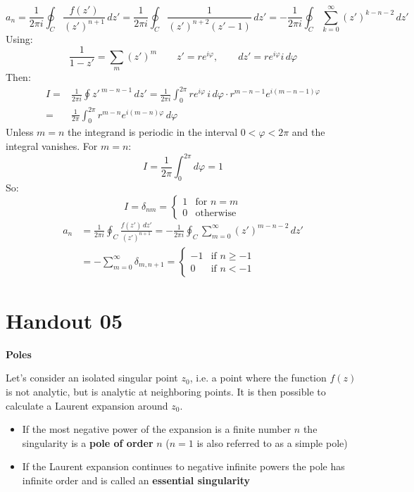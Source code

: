 \documentclass{article}
\begin{document}
\newpage
\begin{equation}
    a_n = \frac{1}{2\pi i} \oint_C \frac{f(z')}{(z')^{n+1}} \, dz'
= \frac{1}{2\pi i} \oint_C \frac{1}{(z')^{n+2}(z'-1)} \, dz'
= -\frac{1}{2\pi i} \oint_C \sum_{k=0}^{\infty} (z')^{k - n - 2} \, dz'
\end{equation}
Using:
\begin{equation}
    \frac{1}{1-z'} = \sum_m (z')^m \qquad z' = r e^{i\varphi}, \qquad dz' = r e^{i\varphi} i\, d\varphi
\end{equation}
Then:
\begin{align}
    I =& \frac{1}{2\pi i} \oint z'^{ \ m - n - 1} \, dz' = \frac{1}{2\pi i} \int_0^{2\pi} r e^{i\varphi} \, i \, d\varphi \cdot r^{m - n - 1} e^{i(m - n - 1)\varphi} \\
=& \frac{1}{2\pi} \int_0^{2\pi} r^{m - n} e^{i(m - n)\varphi} \, d\varphi
\end{align}
Unless $m=n$ the integrand is periodic in the interval $0<\varphi<2\pi$ and the integral vanishes. For $m=n$:
\begin{equation}
    I = \frac{1}{2\pi} \int_0^{2\pi} d \varphi = 1
\end{equation}
So:
\begin{equation}
    I = \delta_{nm} = 
\begin{cases}
1 & \text{for } n = m \\
0 & \text{otherwise}
\end{cases}
\end{equation}
\begin{align}
    a_n &= \frac{1}{2\pi i} \oint_C \frac{f(z')\,dz'}{(z')^{n+1}} 
= -\frac{1}{2\pi i} \oint_C \sum_{m=0}^{\infty} (z')^{m - n - 2} \, dz'\\
&= -\sum_{m=0}^{\infty} \delta_{m, n+1}
= \begin{cases}
-1 & \text{if } n \geq -1 \\
0 & \text{if } n < -1
\end{cases}
\end{align}

\section{Handout 05}

\noindent
\textbf{Poles}

\noindent
Let’s consider an isolated singular point $z_0$, i.e. a point where the function $f(z)$ is not analytic, but is analytic at neighboring points. It is then possible to calculate a Laurent expansion around $z_0$.
\begin{itemize}
    \item If the most negative power of the expansion is a finite number $n$ the singularity is a \textbf{pole of order} $n$ ($n=1$ is also referred to as a simple pole)
    \item If the Laurent expansion continues to negative infinite powers the pole has infinite order and is called an \textbf{essential singularity}
\end{itemize}
\end{document}
